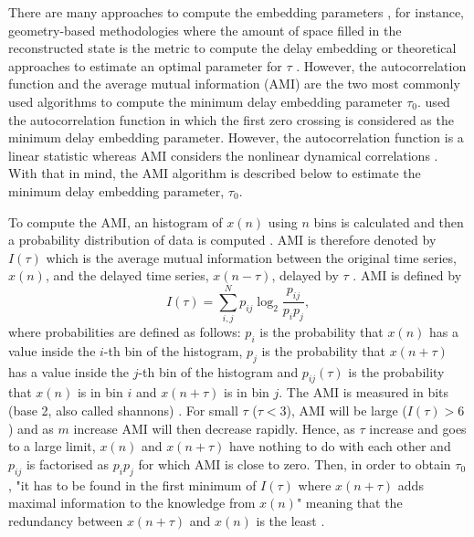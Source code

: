There are many approaches to compute the embedding parameters 
\citep{bradley2015}, for instance, geometry-based methodologies where 
the amount of space filled in the reconstructed state is the metric to 
compute the delay embedding \citep{mrosenstein1994} or 
theoretical approaches to estimate an optimal parameter for 
$\tau$ \citep{casdagli1991}. 
However, the autocorrelation function and the average mutual information 
(AMI) are the two most commonly used algorithms to compute the minimum 
delay embedding parameter $\tau_0$. \cite{emrani2014a} used the 
autocorrelation function in which the first zero crossing is considered 
as the minimum delay embedding parameter. However, the autocorrelation 
function is a linear statistic whereas AMI considers the nonlinear 
dynamical correlations \citep{afraser1986,krakovska2015}.
With that in mind, the AMI algorithm is described below to estimate 
the minimum delay embedding parameter, \texorpdfstring{$\tau_0$}{T}.

To compute the AMI, an histogram of $x(n)$ using $n$ bins is calculated
and then a probability distribution of data is computed \citep{kantz2003}.
AMI is therefore denoted by $I(\tau)$ which is the average mutual 
information between the original time series, $x(n)$, and the delayed time 
series, $x(n-\tau)$, delayed by $\tau$ \citep{kabiraj2012}. AMI is defined by
\begin{equation}\label{eq:ami}
I(\tau) = \sum_{i,j}^N p_{ij} \log_2 \frac{ p_{ij} }{ p_i p_j },
\end{equation}
where probabilities are defined as follows: 
$p_i$ is the probability that $x(n)$ has a value inside the $i$-th bin of 
the histogram, $p_j$ is the probability that $x(n+\tau)$ has a value inside 
the $j$-th bin of the histogram and $p_{ij}(\tau)$ is the probability 
that $x(n)$ is in bin $i$ and $x(n+\tau)$ is in bin $j$.
The AMI is measured in bits (base 2, also called shannons) 
\citep{kantz2003, nonlinearTseries2016}.
For small $\tau$ ($\tau < 3$), AMI will be large ($I(\tau)>6$) and as 
$m$ increase AMI will then decrease rapidly. Hence, as $\tau$ increase 
and goes to a large limit, $x(n)$ and $x(n+\tau)$ have 
nothing to do with each other and $p_{ij}$ is factorised as $p_ip_j$ for 
which AMI is close to zero.  Then, in order to obtain $\tau_0$, 
"it has to be found in the first minimum of $I(\tau)$ where $x(n+\tau)$ 
adds maximal information to the knowledge from $x(n)$" meaning that the 
redundancy between $x(n+\tau)$ and $x(n)$ is the least
\citep[p. 151]{kantz2003}.

